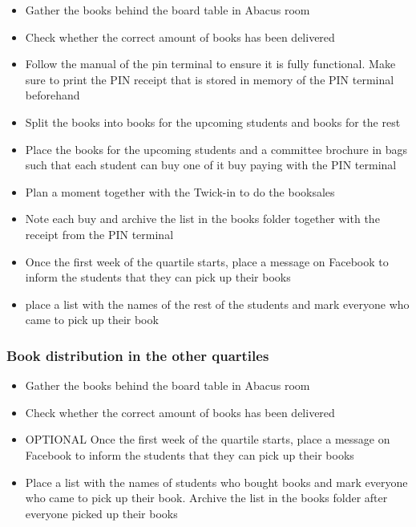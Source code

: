 \documentclass{article}
\begin{document}
\begin{itemize} 
\vspace{-1mm}
\itemsep-1mm 
\item Gather the books behind the board table in Abacus room
\item Check whether the correct amount of books has been delivered
\item Follow the manual of the pin terminal to ensure it is fully functional. Make sure to print the PIN receipt that is stored in memory of the PIN terminal beforehand
\item Split the books into books for the upcoming students and books for the rest
\item Place the books for the upcoming students and a committee brochure in bags such that each student can buy one of it buy paying with the PIN terminal
\item Plan a moment together with the Twick-in to do the booksales
\item Note each buy and archive the list in the books folder together with the receipt from the PIN terminal 
\item Once the first week of the quartile starts, place a message on Facebook to inform the students that they can pick up their books
\item place a list with the names of the rest of the students and mark everyone who came to pick up their book
\end{itemize}

\subsubsection*{Book distribution in the other quartiles}

\begin{itemize} 
\vspace{-1mm}
\itemsep-1mm 
\item Gather the books behind the board table in Abacus room
\item Check whether the correct amount of books has been delivered
\item OPTIONAL Once the first week of the quartile starts, place a message on Facebook to inform the students that they can pick up their books
\item Place a list with the names of students who bought books and mark everyone who came to pick up their book. Archive the list in the books folder after everyone picked up their books
\end{itemize}
\end{document}

